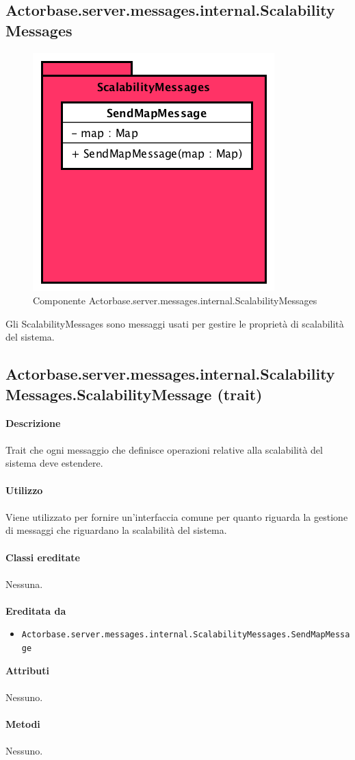 \documentclass[a4paper]{article}
\begin{document}
	\subsection{Actorbase.server.messages.internal.ScalabilityMessages}
					\begin{figure}[H]
			\centering
			\includegraphics[scale = 0.6]{Server/ScalabilityMessages.png}
			\caption{Componente Actorbase.server.messages.internal.ScalabilityMessages}
		\end{figure}
		Gli ScalabilityMessages sono messaggi usati per gestire le proprietà di scalabilità del sistema.
		
	\subsection{Actorbase.server.messages.internal.ScalabilityMessages.ScalabilityMessage (trait)}
		\textbf{Descrizione}
			\\ \\
			Trait che ogni messaggio che definisce operazioni relative alla scalabilità del sistema deve estendere.
			\\ \\
		\textbf{Utilizzo}
			\\ \\
			Viene utilizzato per fornire un'interfaccia comune per quanto riguarda la gestione di messaggi che riguardano la scalabilità del sistema.
			\\ \\
		\textbf{Classi ereditate}
			\\ \\
			Nessuna.
			\\ \\
		\textbf{Ereditata da}
			\begin{itemize}
				\item \texttt{Actorbase.server.messages.internal.ScalabilityMessages.SendMapMessage}
			\end{itemize}
		\textbf{Attributi}
			\\ \\
			Nessuno.
			\\ \\
		\textbf{Metodi}
			\\ \\
			Nessuno.
			
\end{document}

